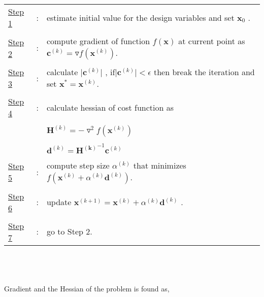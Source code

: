 \documentclass[]{report}
\begin{document}
\begin{tabular}{lll}
\underline{Step 1} &:& estimate initial value for the design variables and set $\mathbf x_0$ .\\ 
&&\\
 \underline{Step 2} &:& compute gradient of function $f\left(\mathbf x\right)$ at current point as $\mathbf c^{(k)}=\triangledown f\left(\mathbf x^{(k)}\right)$.\\ 
 &&\\
 \underline{Step 3} &:& calculate $\lvert \mathbf c^{(k)}\rvert$ ,  if$\lvert \mathbf c^{(k)}\rvert<\epsilon$ then break the iteration and set $\mathbf x^*=\mathbf x^{(k)}$. \\ 
 &&\\
 \underline{Step 4} &:& calculate hessian of cost function as\\ 
  &&\\
  && $\mathbf H^{(k)}=-\triangledown^2 f\left(\mathbf x^{(k)}\right)$   \\ 
  &&\\
   &&$\mathbf d^{(k)}=\mathbf {H^{(k)}}^{-1}\mathbf{c}^{(k)} $\\
 &&\\
 \underline{Step 5} &:& compute step size $\alpha^{(k)}$ that minimizes $f\left(\mathbf x^{(k)}+\alpha^{(k)}\mathbf d^{(k)}\right)$. \\ 
 &&\\
 \underline{Step 6} &:& update $\mathbf x^{(k+1)}=\mathbf x^{(k)}+\alpha^{(k)}\mathbf d^{(k)}$ .\\
  &&\\
\underline{Step 7} &:& go to Step 2.
\end{tabular} 
\\
~
\\~\\
Gradient and the Hessian of the problem is found as,
\end{document}
